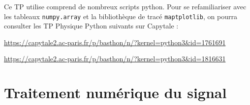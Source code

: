 




\begin{danger}
  Ce TP utilise comprend de nombreux scripts python. Pour se refamiliariser avec les tableaux \texttt{numpy.array} et la bibliothèque de tracé \texttt{maptplotlib}, on pourra consulter les TP Physique Python suivants sur Capytale :
  \begin{liste}
    \item  \href{https://capytale2.ac-paris.fr/p/basthon/n/?kernel=python3&id=1761691}{https://capytale2.ac-paris.fr/p/basthon/n/?kernel=python3\&id=1761691}
    \item  \href{https://capytale2.ac-paris.fr/p/basthon/n/?kernel=python3&id=1816631}{https://capytale2.ac-paris.fr/p/basthon/n/?kernel=python3\&id=1816631}
  \end{liste}
\end{danger}

\section{Traitement numérique du signal}
\label{sec:mod_freq}

